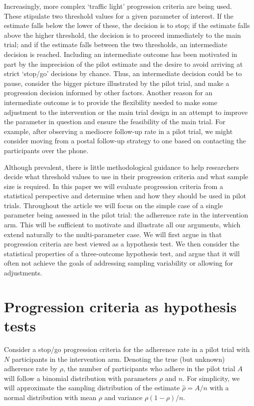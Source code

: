 \documentclass[sagev, Crown]{sagej} %
\begin{document}
Increasingly, more complex `traffic light' progression criteria are being used. These stipulate two threshold values for a given parameter of interest. If the estimate falls below the lower of these, the decision is to stop; if the estimate falls above the higher threshold, the decision is to proceed immediately to the main trial; and if the estimate falls between the two thresholds, an intermediate decision is reached. Including an intermediate outcome has been motivated in part by the imprecision of the pilot estimate and the desire to avoid arriving at strict `stop/go' decisions by chance. Thus, an intermediate decision could be to pause, consider the bigger picture illustrated by the pilot trial, and make a progression decision informed by other factors. Another reason for an intermediate outcome is to provide the flexibility needed to make some adjustment to the intervention or the main trial design in an attempt to improve the parameter in question and ensure the feasibility of the main trial. For example, after observing a mediocre follow-up rate in a pilot trial, we might consider moving from a postal follow-up strategy to one based on contacting the participants over the phone. 

Although prevalent, there is little methodological guidance to help researchers decide what threshold values to use in their progression criteria and what sample size is required. In this paper we will evaluate progression criteria from a statistical perspective and determine when and how they should be used in pilot trials. Throughout the article we will focus on the simple case of a single parameter being assessed in the pilot trial: the adherence rate in the intervention arm. This will be sufficient to motivate and illustrate all our arguments, which extend naturally to the multi-parameter case. We will first argue in that progression criteria are best viewed as a hypothesis test. We then consider the statistical properties of a three-outcome hypothesis test, and argue that it will often not achieve the goals of addressing sampling variability or allowing for adjustments. 

\section{Progression criteria as hypothesis tests}\label{sec:tests}

Consider a stop/go progression criteria for the adherence rate in a pilot trial with $N$ participants in the intervention arm. Denoting the true (but unknown) adherence rate by $\rho$, the number of participants who adhere in the pilot trial $A$ will follow a binomial distribution with parameters $\rho$ and $n$. For simplicity, we will approximate the sampling distribution of the estimate $\hat{\rho} = A/n$ with a normal distribution with mean $\rho$ and variance $\rho (1 - \rho) / n$.
\end{document}
